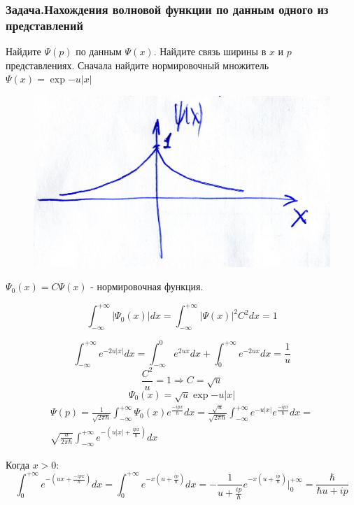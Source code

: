 \subsubsection{Задача.Нахождения волновой функции по данным одного из представлений}

Найдите $\Psi(p)$ по данным $\Psi(x)$. Найдите связь ширины в $x$ и $p$ представлениях. Сначала найдите нормировочный множитель $\Psi(x)=\exp{-u|x|}$


\begin{figure}
\includegraphics[width=\linewidth]{fig/fig73}
\caption{}
\vspace{-17pt}
\end{figure}

$\Psi_0(x)=C\Psi(x)$ - нормировочная функция.

$$\int_{-\infty}^{+\infty}|\Psi_0(x)|dx = \int_{-\infty}^{+\infty}|\Psi(x)|^2C^2dx=1$$

$$\int_{-\infty}^{+\infty} e^{-2u|x|}dx=\int_{-\infty}^{0} e^{2ux}dx+\int_{0}^{+\infty} e^{-2ux}dx=\frac{1}{u}$$
$$\frac{C^2}{u}=1 \Longrightarrow C=\sqrt{u}$$
$$\Psi_0(x)=\sqrt{u}\exp{-u|x|}$$
\begin{gather*}
 \Psi(p)=\frac{1}{\sqrt{2\pi \hbar}}\int_{-\infty}^{+\infty} \Psi_0(x) e^{\frac{-ipx}{\hbar}}dx=\frac{\sqrt{u}}{\sqrt{2\pi \hbar}}\int_{-\infty}^{+\infty} e^{-u|x|} e^{\frac{-ipx}{\hbar}}dx=\\
 \sqrt{\frac{u}{2\pi \hbar}}\int_{-\infty}^{+\infty} e^{-(u|x|+\frac{ipx}{\hbar})}dx
\end{gather*}

Когда $x>0$:
$$\int_{0}^{+\infty} e^{-(ux+\frac{-ipx}{\hbar})}dx=\int_{0}^{+\infty} e^{-x(u+\frac{ip}{\hbar})}dx=-\frac{1}{u+\frac{ip}{\hbar}}e^{-x(u+\frac{ip}{\hbar})} \bigg|_0^{+\infty}=\frac{\hbar}{\hbar u+ip}$$

